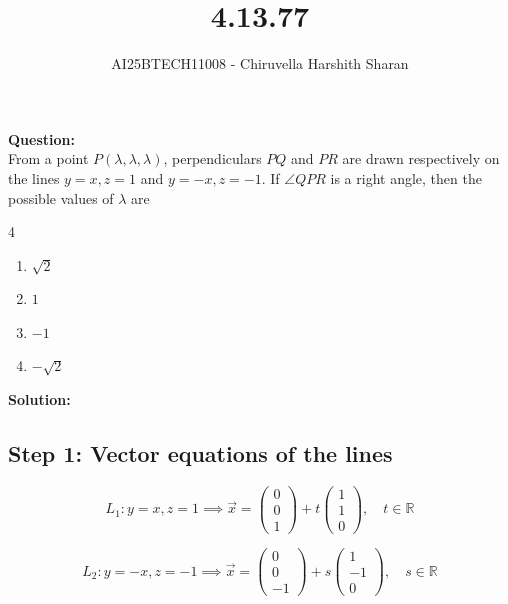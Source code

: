 \documentclass[journal]{IEEEtran}
\begin{document}

\vspace{3cm}

\title{4.13.77}
\author{AI25BTECH11008 - Chiruvella Harshith Sharan}
{\let\newpage\relax\maketitle}

\textbf{Question:} \\

From a point $P(\lambda,\lambda,\lambda)$, perpendiculars $PQ$ and $PR$ are drawn respectively on the lines $y=x,z=1$ and $y=-x,z=-1$. If $\angle QPR$ is a right angle, then the possible values of $\lambda$ are
\begin{multicols}{4}
\begin{enumerate}[label=\alph*)]
    \item $\sqrt{2}$
    \item $1$
    \item $-1$
    \item $-\sqrt{2}$
\end{enumerate}
\end{multicols}

\vspace{0.3cm}
\textbf{Solution:}

\subsection*{Step 1: Vector equations of the lines}

\[
L_1: y=x, z=1 \implies \vec{x} = \begin{pmatrix}0\\0\\1\end{pmatrix} + t \begin{pmatrix}1\\1\\0\end{pmatrix}, \quad t \in \mathbb{R} \tag{1}
\]

\[
L_2: y=-x, z=-1 \implies \vec{x} = \begin{pmatrix}0\\0\\-1\end{pmatrix} + s \begin{pmatrix}1\\-1\\0\end{pmatrix}, \quad s \in \mathbb{R} \tag{2}
\]
\end{document}
